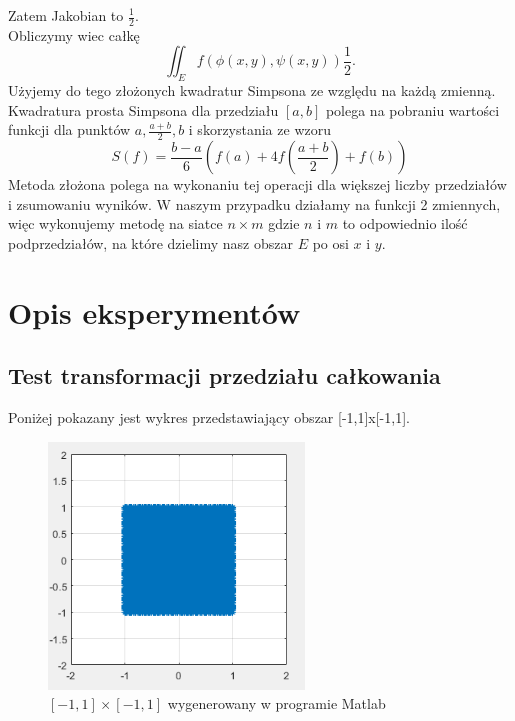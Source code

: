 \documentclass[12pt]{article}
\begin{document}
Zatem Jakobian to $ \frac{1}{2}$.\\
Obliczymy wiec ca\l kę
\begin{equation}
    \iint_E f(\phi(x,y),\psi(x,y))\frac{1}{2}.
\end{equation}
U\.zyjemy do tego z\l o\.zonych kwadratur Simpsona ze względu na ka\.zdą zmienną.
Kwadratura prosta Simpsona dla przedzia\l u $[a,b]$ polega na pobraniu warto\'sci
funkcji dla punkt\'ow $a,\frac{a+b}{2},b$ i skorzystania ze wzoru
\begin{equation}
    S(f) = \frac{b-a}{6} ( f(a)+4f(\frac{a+b}{2})+f(b) )
\end{equation}
Metoda z\l o\.zona polega na wykonaniu tej operacji dla większej liczby przedzia\l \'ow
i zsumowaniu wynik\'ow. W naszym przypadku dzia\l amy na funkcji 2 zmiennych, więc 
wykonujemy metodę na siatce $n \times m$ gdzie $n$ i $m$ to odpowiednio ilo\'s\'c
podprzedzia\l \'ow, na kt\'ore dzielimy nasz obszar $E$ po osi $x$ i $y$.
\section{Opis eksperyment\'ow}
\subsection{Test transformacji przedzia\l u ca\l kowania}
Poni\.zej pokazany jest wykres przedstawiający obszar [-1,1]x[-1,1]. 
\begin{figure}[!h]
    \centering
    \includegraphics[width=6.8cm]{kwad.png}
    \caption{$[-1,1]\times[-1,1]$ wygenerowany w programie Matlab}
\end{figure}
\end{document}
